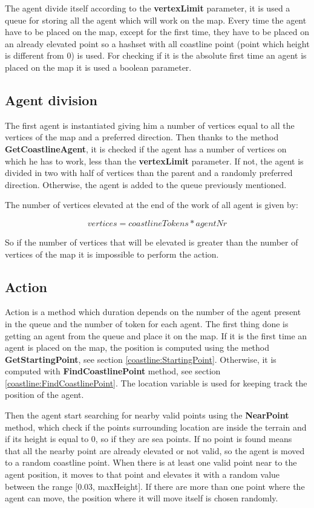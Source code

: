 \documentclass[12pt]{article}
\begin{document}
    The agent divide itself according to the \textbf{vertexLimit} parameter, it is used a queue for storing all the agent which will work on the map. 
    Every time the agent have to be placed on the map, except for the first time, they have to be placed on an already elevated point so a hashset with all coastline point
    (point which height is different from 0) is used. For checking if it is the absolute first time an agent is placed on the map it is used a boolean parameter. 

    \subsection{Agent division}
    The first agent is instantiated giving him a number of vertices equal to all the vertices of the map and a preferred direction. Then thanks to the method \textbf{GetCoastlineAgent},
    it is checked if the agent has a number of vertices on which he has to work, less than the \textbf{vertexLimit} parameter. If not, the agent is divided in two with half
    of vertices than the parent and a randomly preferred direction. Otherwise, the agent is added to the queue previously mentioned.  

    The number of vertices elevated at the end of the work of all agent is given by:

    \begin{equation}
        vertices = coastlineTokens * agentNr
    \end{equation}

    \noindent
    So if the number of vertices that will be elevated is greater than the number of vertices of the map it is impossible to perform the action.

    \subsection{Action}
    Action is a method which duration depends on the number of the agent present in the queue and the number of token for each agent. The first thing done is getting an agent
    from the queue and place it on the map. If it is the first time an agent is placed on the map, the position is computed using the method \textbf{GetStartingPoint}, see 
    section \ref{coastline:StartingPoint}. Otherwise, it is computed with \textbf{FindCoastlinePoint} method, see section \ref{coastline:FindCoastlinePoint}. The location variable is used for keeping
    track the position of the agent.

    Then the agent start searching for nearby valid points using the \textbf{NearPoint} method, which check if the points surrounding location are inside the terrain and if its
    height is equal to 0, so if they are sea points. If no point is found means that all the nearby point are already elevated or not valid,
    so the agent is moved to a random coastline point. When there is at least one valid point near to the agent position, it moves to that point and elevates it with a random
    value between the range [0.03, maxHeight]. If there are more than one point where the agent can move, the position where it will move itself is chosen randomly.
\end{document}
